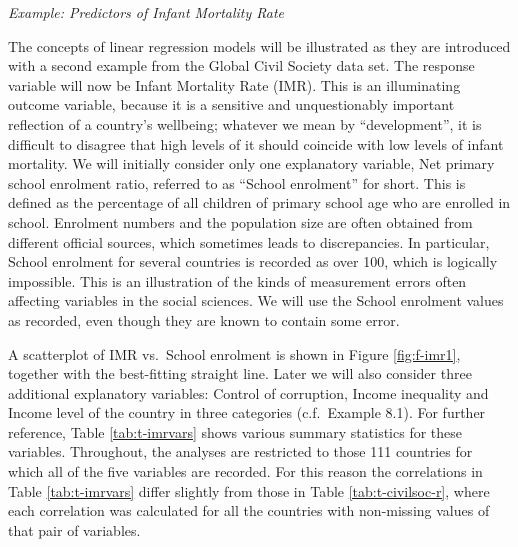 \documentclass[11pt,a4paper,openany]{book}
\begin{document}
\emph{Example: Predictors of Infant Mortality Rate}

The concepts of linear regression models will be illustrated as they are
introduced with a second example from the Global Civil Society data set.
The response variable will now be Infant Mortality Rate (IMR). This is
an illuminating outcome variable, because it is a sensitive and
unquestionably important reflection of a country's wellbeing; whatever
we mean by ``development'', it is difficult to disagree that high levels
of it should coincide with low levels of infant mortality. We will
initially consider only one explanatory variable, Net primary school
enrolment ratio, referred to as ``School enrolment'' for short. This is
defined as the percentage of all children of primary school age who are
enrolled in school. Enrolment numbers and the population size are often
obtained from different official sources, which sometimes leads to
discrepancies. In particular, School enrolment for several countries is
recorded as over 100, which is logically impossible. This is an
illustration of the kinds of measurement errors often affecting
variables in the social sciences. We will use the School enrolment
values as recorded, even though they are known to contain some error.

A scatterplot of IMR vs.~School enrolment is shown in Figure
\ref{fig:f-imr1}, together with the best-fitting straight line. Later we
will also consider three additional explanatory variables: Control of
corruption, Income inequality and Income level of the country in three
categories (c.f.~Example 8.1). For further reference, Table
\ref{tab:t-imrvars} shows various summary statistics for these
variables. Throughout, the analyses are restricted to those 111
countries for which all of the five variables are recorded. For this
reason the correlations in Table \ref{tab:t-imrvars} differ slightly
from those in Table \ref{tab:t-civilsoc-r}, where each correlation was
calculated for all the countries with non-missing values of that pair of
variables.
\end{document}
